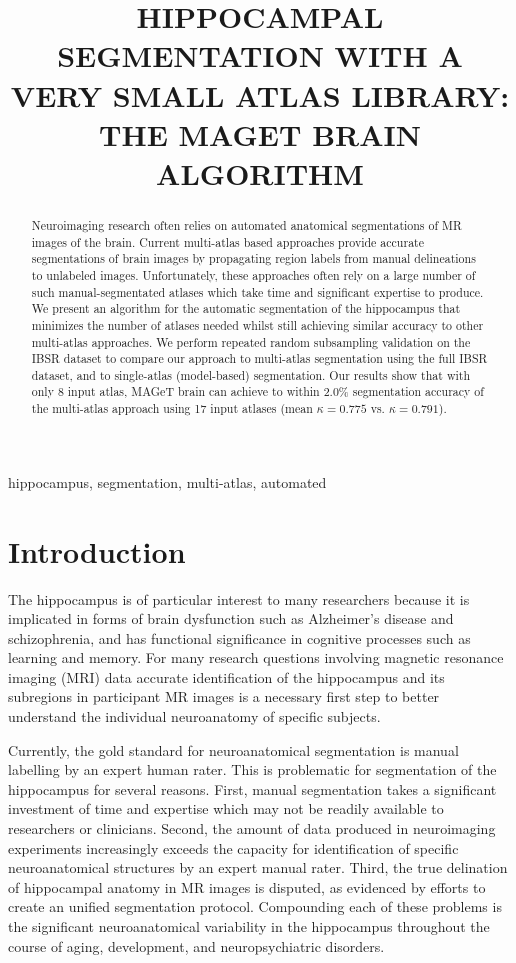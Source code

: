 \documentclass{article}\usepackage{graphicx, color}
\title{HIPPOCAMPAL SEGMENTATION WITH A VERY SMALL ATLAS LIBRARY: THE MAGET
BRAIN ALGORITHM}
\begin{document}
\maketitle       

\begin{abstract}
Neuroimaging research often relies on automated anatomical segmentations of MR
images of the brain. Current multi-atlas based approaches provide accurate
segmentations of brain images by propagating region labels from manual
delineations to unlabeled images. Unfortunately, these approaches often rely on
a large number of such manual-segmentated atlases which take time and
significant expertise to produce. We present an algorithm for the automatic
segmentation of the hippocampus that minimizes the number of atlases needed
whilst still achieving similar accuracy to  other multi-atlas approaches.  We
perform repeated random subsampling validation on the IBSR dataset to compare
our approach to multi-atlas segmentation using the full IBSR dataset, and to
single-atlas (model-based) segmentation. Our results show that with only 8
input atlas, MAGeT brain can achieve to within 2.0\% segmentation accuracy of
the multi-atlas approach using 17 input atlases (mean $\kappa = 0.775$ vs.
$\kappa = 0.791$).

\end{abstract}

\begin{keywords}
hippocampus, segmentation, multi-atlas, automated
\end{keywords}

\section{Introduction}
\label{sec:intro}

The hippocampus is of particular interest to many researchers because it is
implicated in forms of brain dysfunction such as Alzheimer's disease and
schizophrenia, and has functional significance in cognitive processes such as
learning and memory.  For many research questions involving magnetic resonance
imaging (MRI) data accurate identification of the hippocampus and its
subregions in participant MR images is a necessary first step to better
understand the individual neuroanatomy of specific subjects.  

Currently, the gold standard for neuroanatomical segmentation is manual
labelling by an expert human rater.  This is problematic for segmentation of
the hippocampus for several reasons.  First, manual segmentation takes a
significant investment of time and expertise \cite{Hammers2003} which may not
be readily available to researchers or clinicians.  Second, the amount of data
produced in neuroimaging experiments increasingly exceeds the capacity for
identification of specific neuroanatomical structures by an expert manual
rater.  Third, the true delination of hippocampal anatomy in MR images is
disputed\cite{Geuze2004}, as evidenced by efforts to create an unified
segmentation protocol\cite{Jack2011}.  Compounding each of these problems
is the significant neuroanatomical variability in the hippocampus
throughout the course of aging, development, and neuropsychiatric
disorders\cite{someone}.
\end{document}
